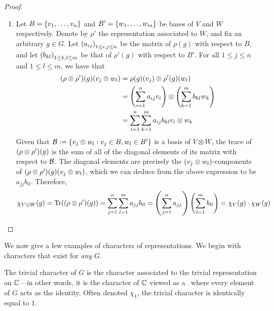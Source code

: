 \begin{proof}
\begin{enumerate}[noitemsep]
        \item Let $B = \left\{ v_1, \ldots, v_n \right\}$ and $B' = \left\{ w_1, \ldots, w_m \right\}$ be bases of $V$ and $W$ respectively. Denote by $\rho'$ the representation associated to $W$, and fix an arbitrary $g \in G$. Let $\left( a_{ij} \right)_{1 \leq i, j \leq n}$ be the matrix of $\rho(g)$ with respect to $B$, and let $\left( b_{kl} \right)_{1 \leq k, l \leq m}$ be that of $\rho'(g)$ with respect to $B'$. %
        For all $1 \leq j \leq n$ and $1 \leq l \leq m$, we have that
        \begin{align*}
            \left( \rho \otimes \rho' \right)\!(g)(v_j \otimes w_l) &= \rho(g)(v_j) \otimes \rho'(g)(w_l) \\
            &= \left( \sum_{i=1}^{n} a_{ij} v_i \right) \otimes \left( \sum_{k=1}^{m} b_{kl} w_k \right) \\
            &= \sum_{i=1}^{n} \sum_{k=1}^{m} a_{ij} b_{kl} v_i \otimes w_k
        \end{align*}
        Given that $\mathcal{B} := \left\{ v_j \otimes w_l : v_j \in B, w_l \in B' \right\}$ is a basis of $V \otimes W$, the trace of $\left( \rho \otimes \rho' \right)\!(g)$ is the sum of all of the diagonal elements of its matrix with respect to $\mathcal{B}$. The diagonal elements are precisely the $\left( v_j \otimes w_l \right)$-components of $\left( \rho \otimes \rho' \right)\!(g)(v_j \otimes w_l)$, which we can deduce from the above expression to be $a_{jj}b_{ll}$. Therefore,
        \begin{align*}
            \chiof{V \otimes W}{g} = \Tr{\parenth{\rho \otimes \rho'}\!(g)} %
            = \sum_{j=1}^{n} \sum_{l=1}^{m} a_{jj} b_{ll} %
            = \parenth{\sum_{j=1}^{n} a_{jj}} \parenth{\sum_{l=1}^{m} b_{ll}} %
            = \chiof{V}{g} \cdot \chiof{W}{g}
        \end{align*}
    \end{enumerate}
\end{proof}

We now give a few examples of characters of representations. We begin with characters that exist for \textit{any} $G$.

\begin{boxexample}
    The trivial character of $G$ is the character associated to the trivial representation on $\mathbb{C}$---in other words, it is the character of $\mathbb{C}$ viewed as a \CGM\ where every element of $G$ acts as the identity. Often denoted $\chi_1$, the trivial character is identically equal to $1$.
\end{boxexample}

